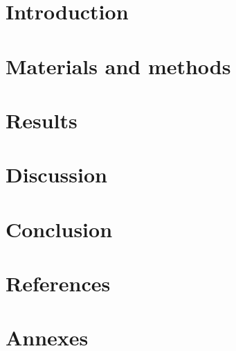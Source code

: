\documentclass[12pt, twoside, a4paper]{report}
\begin{document}
\begin{multicols}{2}
\section{Introduction}


\section{Materials and methods}


\section{Results}


\section{Discussion}


\section{Conclusion}


\section{References}
\begingroup
    \renewcommand{\chapter}[2]{}%

    
    
\endgroup
\end{multicols}

\pagebreak
\section*{Annexes}
\renewcommand\thefigure{\Roman{figure}}
\setcounter{figure}{0}
\end{document}
